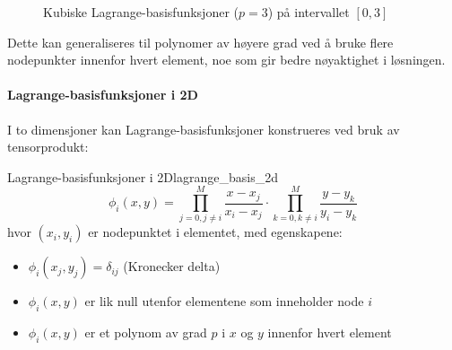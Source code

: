 \begin{figure}[H]
    \centering
    \caption{Kubiske Lagrange-basisfunksjoner ($p=3$) på intervallet $[0,3]$}
    \label{fig:lagrange_basis_cubic}
\end{figure}

Dette kan generaliseres til polynomer av høyere grad ved å bruke flere nodepunkter innenfor hvert element, noe som gir bedre nøyaktighet i løsningen.

\paragraph{Lagrange-basisfunksjoner i 2D}
I to dimensjoner kan Lagrange-basisfunksjoner konstrueres ved bruk av tensorprodukt:

\begin{definition}{Lagrange-basisfunksjoner i 2D}{lagrange_basis_2d}
    \[
        \phi_i(x, y) = \prod_{j=0, j \neq i}^{M} \frac{x - x_j}{x_i - x_j} \cdot \prod_{k=0, k \neq i}^{M} \frac{y - y_k}{y_i - y_k}
    \]
    hvor $(x_i, y_i)$ er nodepunktet i elementet, med egenskapene:
    \begin{itemize}
        \item $\phi_i(x_j, y_j) = \delta_{ij}$ (Kronecker delta)
        \item $\phi_i(x, y)$ er lik null utenfor elementene som inneholder node $i$
        \item $\phi_i(x, y)$ er et polynom av grad $p$ i $x$ og $y$ innenfor hvert element
    \end{itemize}
\end{definition}

